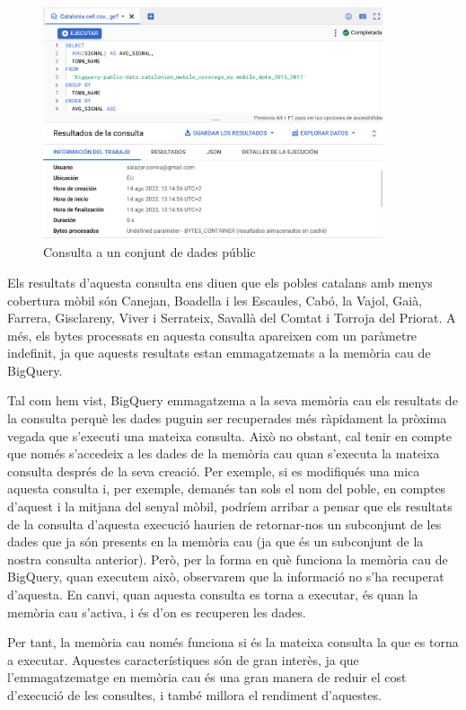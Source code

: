 \documentclass[11pt,longbibliography]{article}
\theoremstyle{definition}
\theoremstyle{remark}
\begin{document}
\begin{figure}[h!]
\begin{center}
\includegraphics[width=10cm]{bq23}
\end{center}
\caption{Consulta a un conjunt de dades públic}
\label{fig:bq23}
\end{figure}


Els resultats d'aquesta consulta ens diuen que els pobles catalans amb menys cobertura mòbil són Canejan, Boadella i les Escaules, Cabó, la Vajol, Gaià, Farrera, Gisclareny, Viver i Serrateix, Savallà del Comtat i Torroja del Priorat. A més, els bytes processats en aquesta consulta apareixen com un paràmetre indefinit, ja que aquests resultats estan emmagatzemats a la memòria cau de BigQuery.



Tal com hem vist, BigQuery emmagatzema a la seva memòria cau els resultats de la consulta perquè les dades puguin ser recuperades més ràpidament la pròxima vegada que s'executi una mateixa consulta. Això no obstant, cal tenir en compte que només s'accedeix a les dades de la memòria cau quan s'executa la mateixa consulta després de la seva creació. Per exemple, si es modifiqués una mica aquesta consulta i, per exemple, demanés tan sols el nom del poble, en comptes d'aquest i la mitjana del senyal mòbil, podríem arribar a pensar que els resultats de la consulta d'aquesta execució haurien de retornar-nos un subconjunt de les dades que ja són presents en la memòria cau (ja que és un subconjunt de la nostra consulta anterior). Però, per la forma en què funciona la memòria cau de BigQuery, quan executem això, observarem que la informació no s'ha recuperat d'aquesta. En canvi, quan aquesta consulta es torna a executar, és quan la memòria cau s'activa, i és d'on es recuperen les dades. 



Per tant, la memòria cau només funciona si és la mateixa consulta la que es torna a executar. Aquestes característiques són de gran interès, ja que l'emmagatzematge en memòria cau és una gran manera de reduir el cost d'execució de les consultes, i també millora el rendiment d'aquestes. 
\end{document}
